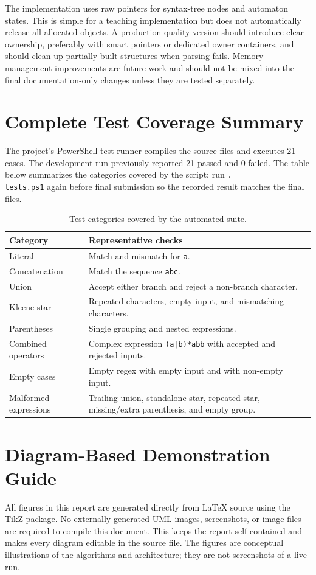 \documentclass[12pt,a4paper]{report}
\begin{document}
The implementation uses raw pointers for syntax-tree nodes and automaton states. This is simple for a teaching implementation but does not automatically release all allocated objects. A production-quality version should introduce clear ownership, preferably with smart pointers or dedicated owner containers, and should clean up partially built structures when parsing fails. Memory-management improvements are future work and should not be mixed into the final documentation-only changes unless they are tested separately.

\section{Complete Test Coverage Summary}
The project's PowerShell test runner compiles the source files and executes 21 cases. The development run previously reported 21 passed and 0 failed. The table below summarizes the categories covered by the script; run \texttt{.\\tests.ps1} again before final submission so the recorded result matches the final files.
\begin{table}[htbp]
\centering
\caption{Test categories covered by the automated suite.}
\begin{tabular}{|p{4.0cm}|p{7.6cm}|}
\hline
\textbf{Category} & \textbf{Representative checks} \\
\hline
Literal & Match and mismatch for \texttt{a}. \\
\hline
Concatenation & Match the sequence \texttt{abc}. \\
\hline
Union & Accept either branch and reject a non-branch character. \\
\hline
Kleene star & Repeated characters, empty input, and mismatching characters. \\
\hline
Parentheses & Single grouping and nested expressions. \\
\hline
Combined operators & Complex expression \texttt{(a|b)*abb} with accepted and rejected inputs. \\
\hline
Empty cases & Empty regex with empty input and with non-empty input. \\
\hline
Malformed expressions & Trailing union, standalone star, repeated star, missing/extra parenthesis, and empty group. \\
\hline
\end{tabular}
\end{table}

\section{Diagram-Based Demonstration Guide}
All figures in this report are generated directly from LaTeX source using the TikZ package. No externally generated UML images, screenshots, or image files are required to compile this document. This keeps the report self-contained and makes every diagram editable in the source file. The figures are conceptual illustrations of the algorithms and architecture; they are not screenshots of a live run.
\end{document}
